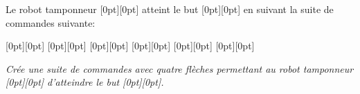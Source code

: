{Le robot tamponneur \raisebox{-0.5ex}[0pt][0pt]{} atteint le but \raisebox{-0.5ex}[0pt][0pt]{} en suivant la suite de commandes suivante:

{\centering%
\raisebox{-0.5ex}[0pt][0pt]{} \raisebox{-0.5ex}[0pt][0pt]{} \raisebox{-0.5ex}[0pt][0pt]{} \raisebox{-0.5ex}[0pt][0pt]{} \raisebox{-0.5ex}[0pt][0pt]{} \raisebox{-0.5ex}[0pt][0pt]{}

{\centering%
\par}\par}



{\em
Crée une suite de commandes avec quatre flèches permettant au robot tamponneur \raisebox{-0.5ex}[0pt][0pt]{} d’atteindre le but \raisebox{-0.5ex}[0pt][0pt]{}.

{\centering%
{\centering%
\par}

{\centering%
\par}\par}


}



}
